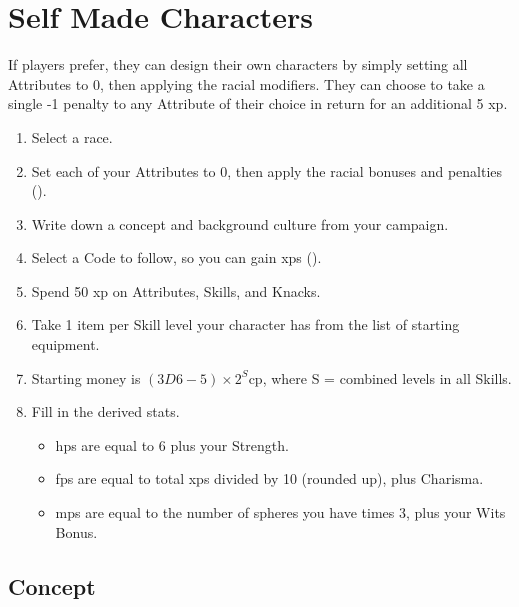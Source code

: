 \section{Self Made Characters}

\begin{multicols}{2}

\label{playerchosen}

If players prefer, they can design their own characters by simply setting all Attributes to 0, then applying the racial modifiers.
They can choose to take a single -1 penalty to any Attribute of their choice in return for an additional 5 \gls{xp}.

\begin{enumerate}
  \item\label{sumCCrace}
  Select a race.
  \item\label{sumCCatt}
  Set each of your Attributes to 0, then apply the racial bonuses and penalties ().
  \item\label{sumCCconcept}
  Write down a concept and background culture from your campaign.
  \item\label{sumCCcode}
  Select a Code to follow, so you can gain \glspl{xp} ().
  \item\label{sumCCxp}
  Spend 50 \gls{xp} on Attributes, Skills, and Knacks\iftoggle{core}{ (Core rules, \autopageref{knacks}.)}{}.
  \item\label{sumCCequip}
  Take 1 item per Skill level your character has from the list of starting equipment.
  \item\label{sumCCcoin}
  Starting money is $(3D6-5)\times 2^S$\gls{cp}, where S = combined levels in all Skills.
  \item
  Fill in the derived stats.
  \begin{itemize}
    \item
    \glspl{hp} are equal to 6 plus your Strength.
    \item
    \glspl{fp} are equal to total \glspl{xp} divided by 10 (rounded up), plus Charisma.
    \item
    \glspl{mp} are equal to the number of spheres you have times 3, plus your Wits Bonus.

  \end{itemize}
\end{enumerate}

\subsection{Concept}


\end{multicols}
